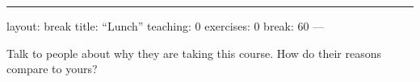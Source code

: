 \begin{center}
\rule{3in}{0.4pt}
\end{center}
layout: break
title: ``Lunch''
teaching: 0
exercises: 0
break: 60
---

Talk to people about why they are taking this course.
How do their reasons compare to yours?


